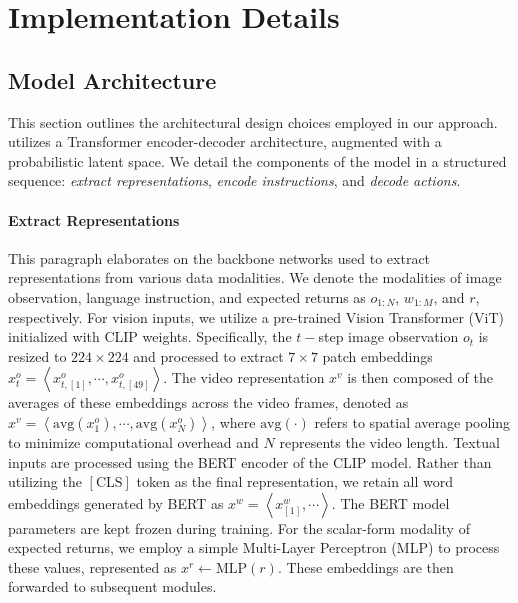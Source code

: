 
\section{Implementation Details} \label{appendix:implementation}

\subsection{Model Architecture} \label{appendix:architecture}
This section outlines the architectural design choices employed in our approach. \agent utilizes a Transformer encoder-decoder architecture, augmented with a probabilistic latent space. We detail the components of the model in a structured sequence: \textit{extract representations}, \textit{encode instructions}, and \textit{decode actions}. 

\paragraph{Extract Representations} 
This paragraph elaborates on the backbone networks used to extract representations from various data modalities. We denote the modalities of image observation, language instruction, and expected returns as ${o}_{1:N}$, ${w}_{1:M}$, and $r$, respectively. For vision inputs, we utilize a pre-trained Vision Transformer (ViT) \citep{vit} initialized with CLIP \citep{clip} weights. Specifically, the $t-$step image observation $o_t$ is resized to $224 \times 224$ and processed to extract $7\times7$ patch embeddings ${x}^{o}_{t} = \left< {x}^{o}_{t, [1]}, \cdots, {x}^{o}_{t, [49]} \right>$. 
The video representation ${x}^{v}$ is then composed of the averages of these embeddings across the video frames, denoted as ${x}^{v} = \left< \text{avg}({x}^{o}_{1}), \cdots, \text{avg}({x}^{o}_{N}) \right>$, where $\text{avg}(\cdot)$ refers to spatial average pooling to minimize computational overhead and $N$ represents the video length. 
Textual inputs are processed using the BERT encoder \citep{bert} of the CLIP model. Rather than utilizing the $[\text{CLS}]$ token as the final representation, we retain all word embeddings generated by BERT as ${x}^{w} = \left< {x}^{w}_{[1]}, \cdots \right>$. The BERT model parameters are kept frozen during training. 
For the scalar-form modality of expected returns, we employ a simple Multi-Layer Perceptron (MLP) to process these values, represented as ${x}^{r} \leftarrow \text{MLP}(r)$. These embeddings are then forwarded to subsequent modules.


